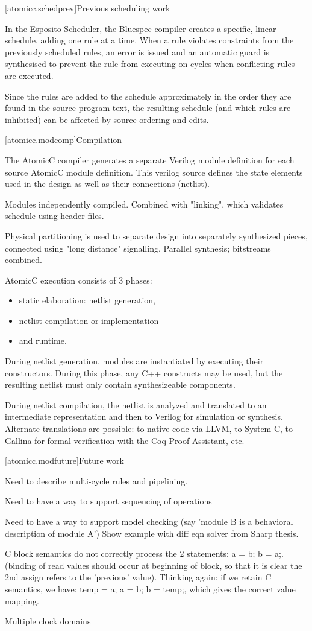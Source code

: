 [atomicc.schedprev]{Previous scheduling work}

In the Esposito Scheduler\cite{Esposito:Patent},
the Bluespec compiler creates a specific, linear schedule, adding
one rule at a time.  When a rule violates constraints from the previously scheduled
rules, an error is issued and an automatic guard is synthesised to prevent the
rule from executing on cycles when conflicting rules are executed.

Since the rules are added to the schedule approximately in the order they are
found in the source program text, the resulting schedule (and which rules are
inhibited) can be affected by source ordering and edits.

[atomicc.modcomp]{Compilation}

The AtomicC compiler generates a separate Verilog module definition
for each source AtomicC module definition.
This verilog source defines the state elements
used in the design as well as their connections (netlist).

Modules independently compiled.  Combined with "linking", which validates schedule using header files.

Physical partitioning is used to separate design into separately synthesized pieces, connected using
"long distance" signalling.  Parallel synthesis; bitstreams combined.

AtomicC execution consists of 3 phases:
\begin{itemize}
\item static elaboration: netlist generation, 
\item netlist compilation or implementation
\item and runtime.
\end{itemize}

During netlist
generation, modules are instantiated by executing their
constructors. During this phase, any C++ constructs may be used, but
the resulting netlist must only contain synthesizeable components.

During netlist compilation, the netlist is analyzed and translated to
an intermediate representation and then to Verilog for simulation or
synthesis. Alternate translations are possible: to native code via
LLVM, to System C, to Gallina for formal verification with the Coq
Proof Assistant, etc.

[atomicc.modfuture]{Future work}

Need to describe multi-cycle rules and pipelining.

Need to have a way to support sequencing of operations

Need to have a way to support model checking (say 'module B is a behavioral description of module A')
Show example with diff eqn solver from Sharp thesis.

C block semantics do not correctly process the 2 statements: a = b; b = a;.
(binding of read values should occur at beginning of block, so that it is clear the
2nd assign refers to the 'previous' value).
Thinking again: if we retain C semantics, we have: temp = a; a = b; b = temp;, which
gives the correct value mapping.

Multiple clock domains
